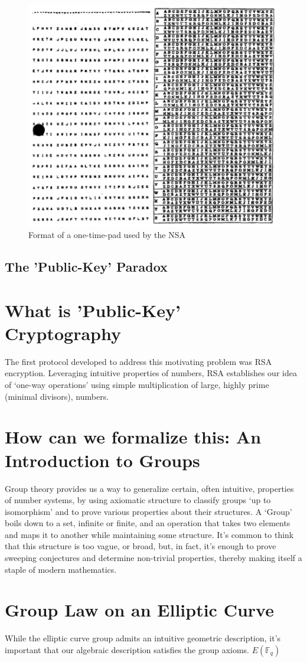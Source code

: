 \documentclass[11pt,a4paper]{article}
\newcommand{\field}{\mathbb{F}}
\begin{document}
\begin{figure}[h]
\begin{center}
\includegraphics[scale=.25]{images/diana} 
\caption{Format of a one-time-pad used by the NSA\autocite{diana}}
\end{center}
\end{figure}
  

\subsection{The 'Public-Key' Paradox}


\section{What is 'Public-Key' Cryptography}
The first protocol developed to address this motivating problem was RSA encryption. Leveraging intuitive properties of numbers, RSA establishes our idea of ‘one-way operations’ using simple multiplication of large, highly prime (minimal divisors), numbers. 

\section{How can we formalize this: An Introduction to Groups}
Group theory provides us a way to generalize certain, often intuitive, properties of number systems, by using axiomatic structure to classify groups ‘up to isomorphism’ and to prove various properties about their structures. A ‘Group’ boils down to a set, infinite or finite, and an operation that takes two elements and maps it to another while maintaining some structure. It’s common to think that this structure is too vague, or broad, but, in fact, it’s enough to prove sweeping conjectures and determine non-trivial properties, thereby making itself a staple of modern mathematics.


\section{Group Law on an Elliptic Curve}
While the elliptic curve group admits an intuitive geometric description, it's important that our algebraic description satisfies the group axioms.  $ E(\field_{q} )$ 
\autocite[10]{koblitz}

\newpage 

\printbibliography
\end{document}

